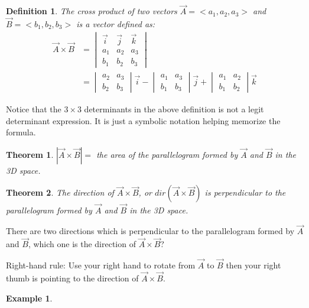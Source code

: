 \documentclass{article}
\newtheorem*{theorem}{Theorem}
\newtheorem*{definition}{Definition}
\newtheorem{example}{Example}
\begin{document}
\begin{definition}
  The cross product of two vectors $\vec{A} = <a_1, a_2, a_3>$ and
  $\vec{B} = <b_1, b_2, b_3>$ is a vector defined as:
  \[
    \begin{split}
    \vec{A} \times \vec{B} &= \begin{vmatrix}
                                \vec{i} & \vec{j} & \vec{k} \\
                                a_1 & a_2 & a_3 \\
                                b_1 & b_2 & b_3
                              \end{vmatrix} \\
                           &= \begin{vmatrix}
                                a_2 & a_3 \\
                                b_2 & b_3 
                              \end{vmatrix} \vec{i} -
                              \begin{vmatrix}
                                a_1 & a_3 \\
                                b_1 & b_3
                              \end{vmatrix} \vec{j} +
                              \begin{vmatrix}
                                a_1 & a_2 \\
                                b_1 & b_2
                              \end{vmatrix} \vec{k}
    \end{split}
  \]
\end{definition}

Notice that the $3 \times 3$ determinants in the above definition is not a
legit determinant expression. It is just a symbolic notation helping memorize
the formula.

\begin{theorem}
  $|\vec{A} \times \vec{B}| = $ the area of the parallelogram formed by $\vec{A}$
  and $\vec{B}$ in the 3D space.
\end{theorem}

\begin{theorem}
  The direction of $\vec{A} \times \vec{B}$, or $dir(\vec{A} \times \vec{B})$
  is perpendicular to the parallelogram formed by $\vec{A}$ and $\vec{B}$ in
  the 3D space.
\end{theorem}

There are two directions which is perpendicular to the parallelogram formed by
$\vec{A}$ and $\vec{B}$, which one is the direction of $\vec{A} \times \vec{B}$?

Right-hand rule: Use your right hand to rotate from $\vec{A}$ to $\vec{B}$ then
your right thumb is pointing to the direction of $\vec{A} \times \vec{B}$.

\begin{example}
  
\end{example}
\end{document}
